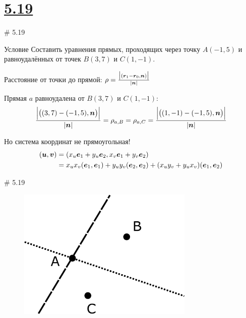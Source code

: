 \documentclass[russian]{beamer}
\begin{document}
    
  \section{\uline{5.19}}
  
  \begin{frame}{\# 5.19}
  

    \begin{block}{Условие}
      Составить уравнения прямых, проходящих через точку $A(-1, 5)$ и равноудалённых от точек $B(3, 7)$ и $C(1, -1)$.
    \end{block}
    
    \pause
    
    \begin{block}{}
      Расстояние от точки до прямой:
      $\rho = \frac{\bigl|(\boldsymbol r_1 - \boldsymbol r_0, \boldsymbol n)\bigr|}{|\boldsymbol n|}$
      
      Прямая $a$ равноудалена от $B(3, 7)$ и $C(1, -1)$:
      \[
        \frac{\Bigl|\bigl((3, 7) - (-1, 5), \boldsymbol n\bigr)\Bigr|}{|\boldsymbol n|} = \rho_{a, B}
        = \rho_{a, C}
        = \frac{\Bigl|\bigl((1, -1) - (-1, 5), \boldsymbol n\bigr)\Bigr|}{|\boldsymbol n|}
      \]
      
      \pause
      
      Но система координат не прямоугольная!
      \begin{equation*}
      \begin{split}
        (\boldsymbol u, \boldsymbol v)
        &= (x_u \boldsymbol e_1 + y_u \boldsymbol e_2, x_v \boldsymbol e_1 + y_v \boldsymbol e_2)\\
        &= x_u x_v(\boldsymbol e_1, \boldsymbol e_1) + y_u y_v(\boldsymbol e_2, \boldsymbol e_2) + (x_u y_v + y_u x_v)(\boldsymbol e_1, \boldsymbol e_2)
      \end{split}
      \end{equation*}
    \end{block}
  \end{frame}
    
    
  \begin{frame}{\# 5.19}
    \begin{figure}
      \centering
      \includegraphics[width=0.75\textwidth]{5-19}
    \end{figure}
  \end{frame}
    
\end{document}
